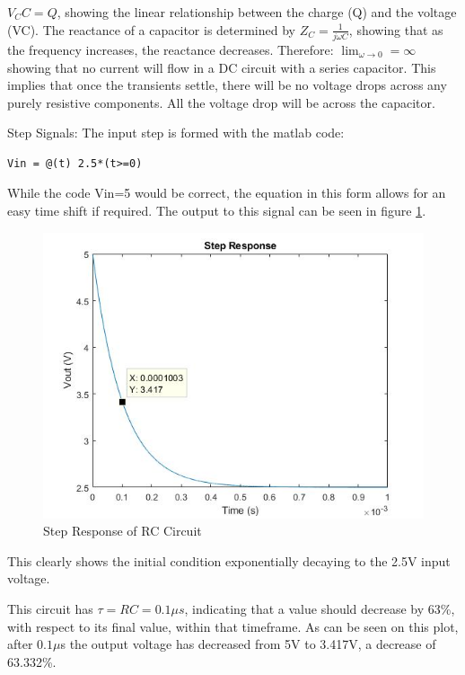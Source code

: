 \documentclass[11pt, oneside, titlepage]{article}   	%
\begin{document}
$V_{C}C=Q$, showing the linear relationship between the charge (Q) and the voltage (VC). 
The reactance of a capacitor is determined by $Z_C=\frac{1}{j\omega C}$, showing that as the frequency increases, the reactance decreases. Therefore: $\lim_{\omega \to 0}=\infty$ showing that no current will flow in a DC circuit with a series capacitor. This implies that once the transients settle, there will be no voltage drops across any purely resistive components. All the voltage drop will be across the capacitor. 

Step Signals: The input step is formed with the matlab code:
\begin{verbatim}
Vin = @(t) 2.5*(t>=0)
\end{verbatim}

While the code Vin=5 would be correct, the equation in this form allows for an easy time shift if required. 
The output to this signal can be seen in figure \ref{fig:ex1_1}.

\begin{figure}[h]
\center
\includegraphics[scale = 0.5]{exercise1_1}
\caption{Step Response of RC Circuit} \label{fig:ex1_1}
\end{figure}




This clearly shows the initial condition exponentially decaying to the 2.5V input voltage. 

This circuit has $\tau = RC = 0.1\mu s$, indicating that a value should decrease by 63\%, with respect to its final value, within that timeframe. As can be seen on this plot, after $0.1\mu$s the output voltage has decreased from 5V to 3.417V, a decrease of 63.332\%.
\end{document}
